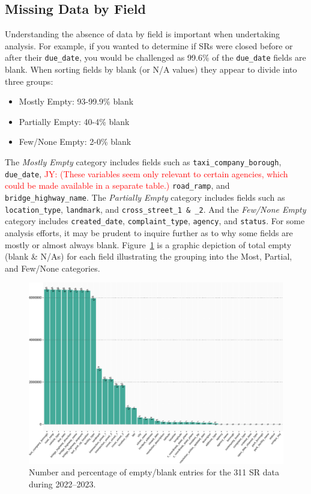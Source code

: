 \documentclass[linenumber]{jdsart}
\newcommand{\jy}[1]{\textcolor{red}{JY: (#1)}}
\begin{document}
\subsection{Missing Data by Field}
\label{sec:blanks}
Understanding the absence of data by field is important 
when undertaking analysis. For example, if you wanted to 
determine if SRs were closed before or after their
\texttt{due\_date}, you would be challenged as 99.6\% of the
\texttt{due\_date} fields are blank. When sorting fields by
blank (or N/A values) they appear to divide into three groups:

\begin{itemize}[left=1.5em]
    \item Mostly Empty: 93-99.9\% blank 
    \item Partially Empty: 40-4\% blank
    \item Few/None Empty: 2-0\% blank
\end{itemize}

The \textit{Mostly Empty} category includes fields such as
\texttt{taxi\_company\_borough}, \texttt{due\_date},
\jy{These variables seem only relevant to certain agencies, which
  could be made available in a separate table.}
\texttt{road\_ramp}, and \texttt{bridge\_highway\_name}.
The \textit{Partially Empty} category includes fields such as
\texttt{location\_type}, \texttt{landmark}, 
and \texttt{cross\_street\_1 \& \_2}. And the \textit{Few/None Empty} 
category includes \texttt{created\_date}, \texttt{complaint\_type},
\texttt{agency}, and \texttt{status}. For some analysis efforts, it may be
prudent to inquire further as to why some fields are 
mostly or almost always blank. Figure~\ref{fig:blank_fields} is 
a graphic depiction of total empty (blank \& N/As) for each 
field illustrating the grouping into 
the Most, Partial, and Few/None categories.

\begin{figure}[tbp]
	\centering
  	\includegraphics[width=\textwidth]{BlankFields-crop.pdf}
	\caption{Number and percentage of empty/blank entries for the
          311 SR data during 2022--2023.}
	\label{fig:blank_fields}
\end{figure}
\end{document}
